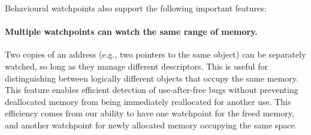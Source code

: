 \documentclass[letterpaper,twocolumn,10pt]{article}
\begin{document}


Behavioural watchpoints also support the following important features:

\paragraph{Multiple watchpoints can watch the same range of memory.} Two copies of an address (e.g., two pointers to the same object) can be separately watched, so long as they manage different descriptors. This is useful for distinguishing between logically different objects that occupy the same memory. This feature enables efficient detection of use-after-free bugs without preventing deallocated memory from being immediately reallocated for another use. This efficiency comes from our ability to have one watchpoint for the freed memory, and another watchpoint for newly allocated memory occupying the same space. %
\end{document}
